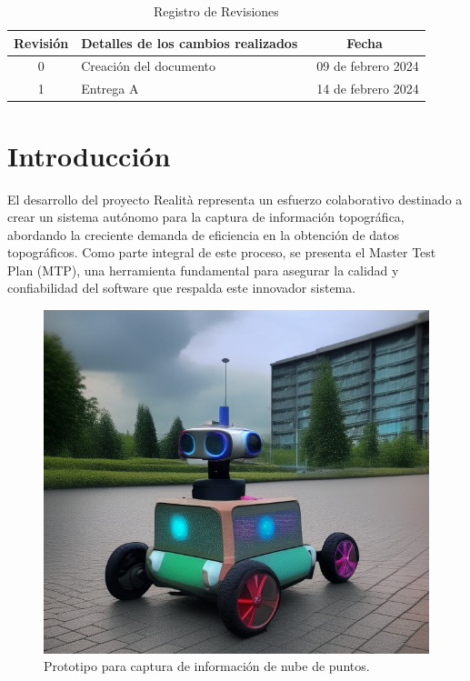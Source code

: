 \documentclass[12pt,a4paper, twoside]{article} %
\begin{document}
\begin{table}[ht]
  \centering
  \caption{Registro de Revisiones}
  \label{tab:registro}
  \begin{tabularx}{\linewidth}{|c|X|c|}
    \hline
    Revisión & Detalles de los cambios realizados & Fecha \\
    \hline
    0 & Creación del documento & \ 09 de febrero 2024 \\
    \hline
    1 & Entrega A & \ 14 de febrero 2024 \\
    \hline
  \end{tabularx}
\end{table}

\maketitle
\tableofcontents

\newpage

\section{Introducción}
\label{sec:org60390fa}

El desarrollo del proyecto Realità representa un esfuerzo colaborativo destinado a crear un sistema autónomo para la captura de información topográfica, abordando la creciente demanda de eficiencia en la obtención de datos topográficos. Como parte integral de este proceso, se presenta el Master Test Plan (MTP), una herramienta fundamental para asegurar la calidad y confiabilidad del software que respalda este innovador sistema.


\begin{figure}[htpb]
\centering 
\includegraphics[width=1\textwidth]{./Figuras/Prototipo.png}
\caption{Prototipo para captura de información de nube de puntos.}
\label{fig:diagBloques}
\end{figure}
\end{document}
